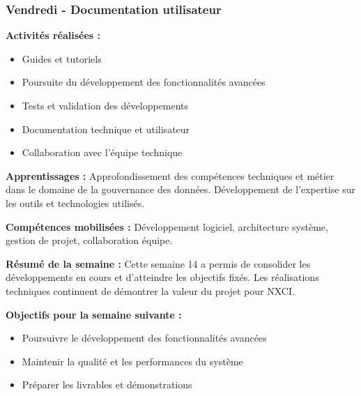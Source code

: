 \subsubsection{Vendredi - Documentation utilisateur}

\textbf{Activités réalisées :}
\begin{itemize}
    \item Guides et tutoriels
    \item Poursuite du développement des fonctionnalités avancées
    \item Tests et validation des développements
    \item Documentation technique et utilisateur
    \item Collaboration avec l'équipe technique
\end{itemize}

\textbf{Apprentissages :}
Approfondissement des compétences techniques et métier dans le domaine de la gouvernance des données. Développement de l'expertise sur les outils et technologies utilisés.

\textbf{Compétences mobilisées :}
Développement logiciel, architecture système, gestion de projet, collaboration équipe.

\textbf{Résumé de la semaine :}
Cette semaine 14 a permis de consolider les développements en cours et d'atteindre les objectifs fixés. Les réalisations techniques continuent de démontrer la valeur du projet pour NXCI.

\textbf{Objectifs pour la semaine suivante :}
\begin{itemize}
    \item Poursuivre le développement des fonctionnalités avancées
    \item Maintenir la qualité et les performances du système
    \item Préparer les livrables et démonstrations
\end{itemize}

